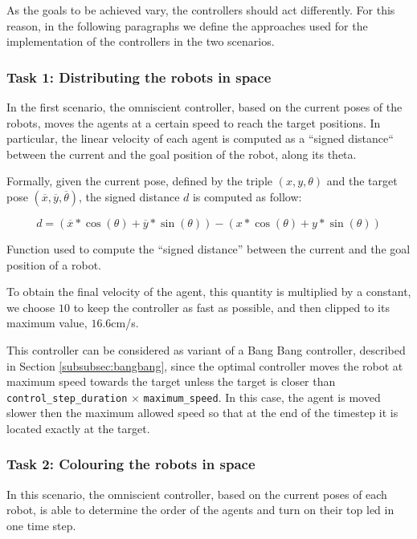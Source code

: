 As the goals to be achieved vary, the controllers should act differently. For this 
reason, in the following paragraphs we define the approaches used for the 
implementation of the controllers in the two scenarios.

\subsubsection{Task 1: Distributing the robots in space}
\label{subsubsec:experttask1}

In the first scenario, the omniscient controller, based on the current poses of the 
robots, moves the agents at a certain speed to reach the target positions. In 
particular, the linear velocity of each agent is computed as a ``signed distance`` 
between the current and the goal position of the robot, along its theta. 

Formally, given the current pose, defined by the triple $(x, y, \theta)$ and the 
target pose $(\overline x, \overline y, \overline \theta)$, the signed distance $d$ 
is computed as follow:
\begin{Equation}[!htb]
	\centering
	\begin{equation}
	d = \left(\overline x * \cos (\theta) + \overline y * \sin (\theta)\right) -
	\left( x * \cos (\theta) + y * \sin (\theta)\right)
	\end{equation}
	\caption[Signed distance function.]{Function used to compute the ``signed 
		distance'' between the current and the goal position of a robot.}
	\label{eq:signeddist}
\end{Equation}

\noindent
To obtain the final velocity of the agent, this quantity is multiplied by a constant, 
we choose $10$ to keep the controller as fast as possible, and then clipped to its 
maximum value, $16.6$\gls{cm/s}.

This controller can be considered as variant of a Bang Bang controller, described 
in Section \ref{subsubsec:bangbang}, since the optimal controller moves the 
robot at maximum speed towards the target unless the target is closer than 
\texttt{control\_step\_duration} $\times$ \texttt{maximum\_speed}. In this case, 
the agent is moved slower then the maximum allowed speed so that at the end of 
the timestep it is located exactly at the target.

\subsubsection{Task 2: Colouring the robots in space}
In this scenario, the omniscient controller, based on the current poses of each 
robot, is able to determine the order of the agents and turn on their top \gls{led}  
in one time step.


